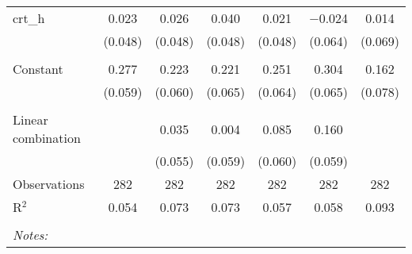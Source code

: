 \begin{table}[!htbp]
\begin{tabular}{@{\extracolsep{5pt}}lcccccc}
 crt\_h & 0.023 & 0.026 & 0.040 & 0.021 & $-$0.024 & 0.014 \\ 
  & (0.048) & (0.048) & (0.048) & (0.048) & (0.064) & (0.069) \\ 
  & & & & & & \\ 
 Constant & 0.277 & 0.223 & 0.221 & 0.251 & 0.304 & 0.162 \\ 
  & (0.059) & (0.060) & (0.065) & (0.064) & (0.065) & (0.078) \\ 
  & & & & & & \\ 
Linear combination &   & 0.035 & 0.004 & 0.085 & 0.160 &  \\ 
 &  & (0.055) & (0.059) & (0.060) & (0.059) &  \\ 
Observations & 282 & 282 & 282 & 282 & 282 & 282 \\ 
R$^{2}$ & 0.054 & 0.073 & 0.073 & 0.057 & 0.058 & 0.093 \\ 
\hline \\[-1.8ex] 
\textit{Notes:} & \multicolumn{6}{l}{} \\ 
\end{tabular} 
\end{table} 
